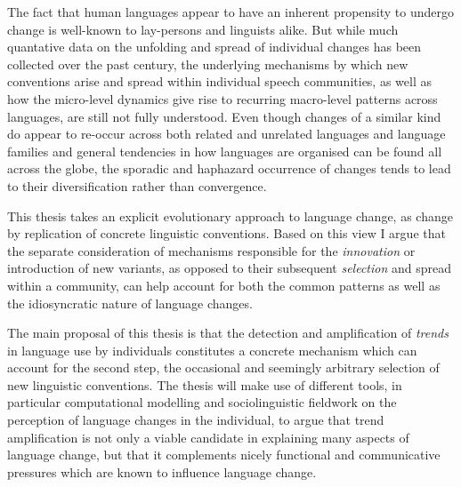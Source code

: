 


The fact that human languages appear to have an inherent propensity to undergo change is well-known to lay-persons and linguists alike.
But while much quantative data on the unfolding and spread of individual changes has been collected over the past century, the underlying mechanisms by which new conventions arise and spread within individual speech communities, as well as how the micro-level dynamics give rise to recurring macro-level patterns across languages, are still not fully understood.
Even though changes of a similar kind do appear to re-occur across both related and unrelated languages and language families and general tendencies in how languages are organised can be found all across the globe, the sporadic and haphazard occurrence of changes tends to lead to their diversification rather than convergence.

This thesis takes an explicit evolutionary approach to language change, as change by replication of concrete linguistic conventions. Based on this view I argue that the separate consideration of mechanisms responsible for the \emph{innovation} or introduction of new variants, as opposed to their subsequent \emph{selection} and spread within a community, can help account for both the common patterns as well as the idiosyncratic nature of language changes.

The main proposal of this thesis is that the detection and amplification of \emph{trends} in language use by individuals constitutes a concrete mechanism which can account for the second step, the occasional and seemingly arbitrary selection of new linguistic conventions.
The thesis will make use of different tools, in particular computational modelling and sociolinguistic fieldwork on the perception of language changes in the individual, to argue that trend amplification is not only a viable candidate in explaining many aspects of language change, but that it complements nicely functional and communicative pressures which are known to influence language change.

